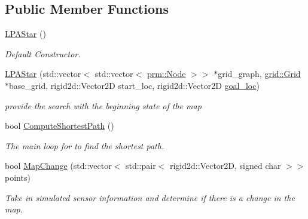 \subsection*{Public Member Functions}
\begin{DoxyCompactItemize}
\item 
\mbox{\label{classhsearch_1_1LPAStar_accb9219b8a08ab651d3d629a29c281a5}} 
\hyperlink{classhsearch_1_1LPAStar_accb9219b8a08ab651d3d629a29c281a5}{L\+P\+A\+Star} ()
\begin{DoxyCompactList}\small\item\em Default Constructor. \end{DoxyCompactList}\item 
\hyperlink{classhsearch_1_1LPAStar_a4272517c63ee82c3b745cbaaa0b98a59}{L\+P\+A\+Star} (std\+::vector$<$ std\+::vector$<$ \hyperlink{structprm_1_1Node}{prm\+::\+Node} $>$$>$ $\ast$grid\+\_\+graph, \hyperlink{classgrid_1_1Grid}{grid\+::\+Grid} $\ast$base\+\_\+grid, rigid2d\+::\+Vector2D start\+\_\+loc, rigid2d\+::\+Vector2D \hyperlink{classhsearch_1_1HSearch_a201d281d6a8d9fcc4158772f862d1847}{goal\+\_\+loc})
\begin{DoxyCompactList}\small\item\em provide the search with the beginning state of the map \end{DoxyCompactList}\item 
bool \hyperlink{classhsearch_1_1LPAStar_abccf3f72259c5311b62ffbfdf78a3de4}{Compute\+Shortest\+Path} ()
\begin{DoxyCompactList}\small\item\em The main loop for to find the shortest path. \end{DoxyCompactList}\item 
bool \hyperlink{classhsearch_1_1LPAStar_ad5ba304f7a500b285d4878ee2090f7c3}{Map\+Change} (std\+::vector$<$ std\+::pair$<$ rigid2d\+::\+Vector2D, signed char $>$$>$ points)
\begin{DoxyCompactList}\small\item\em Take in simulated sensor information and determine if there is a change in the map. \end{DoxyCompactList}\end{DoxyCompactItemize}
